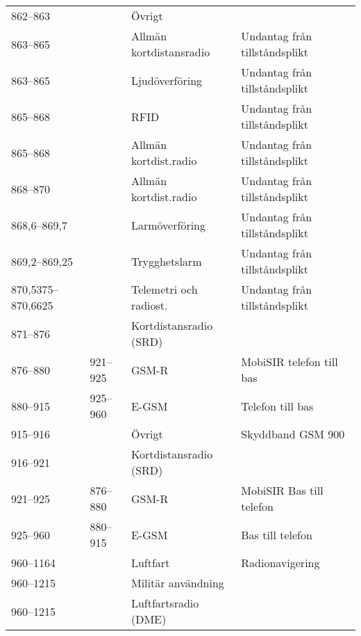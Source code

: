 \begin{landscape}
\begin{longtable}{llll}
	862--863           &                    & Övrigt                  &  \\
	863--865           &                    & Allmän kortdistansradio & Undantag från tillståndsplikt            \\
	863--865           &                    & Ljudöverföring          & Undantag från tillståndsplikt            \\
	865--868           &                    & RFID                    & Undantag från tillståndsplikt            \\
	865--868           &                    & Allmän kortdist.radio   & Undantag från tillståndsplikt            \\
	868--870           &                    & Allmän kortdist.radio   & Undantag från tillståndsplikt            \\
	868,6--869,7       &                    & Larmöverföring          & Undantag från tillståndsplikt            \\
	869,2--869,25      &                    & Trygghetslarm           & Undantag från tillståndsplikt            \\
	870,5375--870,6625 &                    & Telemetri och radiost.  & Undantag från tillståndsplikt            \\
	871--876           &                    & Kortdistansradio (SRD)  &  \\
	876--880           & 921--925           & GSM-R                   & MobiSIR telefon till bas                 \\
	880--915           & 925--960           & E-GSM                   & Telefon till bas                         \\
	915--916           &                    & Övrigt                  & Skyddband GSM 900                        \\
	916--921           &                    & Kortdistansradio (SRD)  &  \\
	921--925           & 876--880           & GSM-R                   & MobiSIR Bas till telefon                 \\
	925--960           & 880--915           & E-GSM                   & Bas till telefon                         \\
	960--1164          &                    & Luftfart                & Radionavigering                          \\
	960--1215          &                    & Militär användning      &  \\
	960--1215          &                    & Luftfartsradio (DME)    &  \\

\end{longtable}
\end{landscape}
